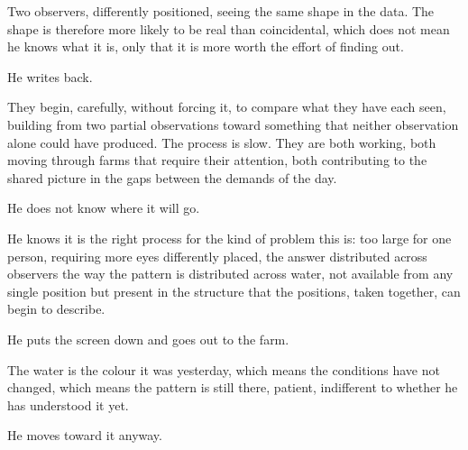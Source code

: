 Two observers, differently positioned, seeing the
same shape in the data. The shape is therefore
more likely to be real than coincidental, which
does not mean he knows what it is, only that it
is more worth the effort of finding out.

He writes back.

They begin, carefully, without forcing it, to
compare what they have each seen, building from
two partial observations toward something that
neither observation alone could have produced.
The process is slow. They are both working, both
moving through farms that require their attention,
both contributing to the shared picture in the
gaps between the demands of the day.

He does not know where it will go.

He knows it is the right process for the kind
of problem this is: too large for one person,
requiring more eyes differently placed, the
answer distributed across observers the way
the pattern is distributed across water, not
available from any single position but present
in the structure that the positions, taken
together, can begin to describe.

He puts the screen down and goes out to the farm.

The water is the colour it was yesterday, which
means the conditions have not changed, which
means the pattern is still there, patient,
indifferent to whether he has understood it yet.

He moves toward it anyway.

